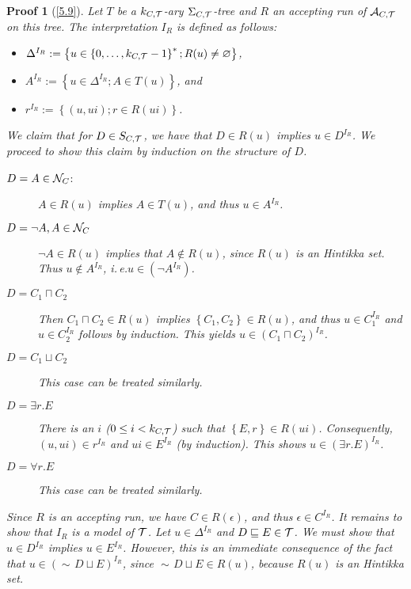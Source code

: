 \documentclass[openany]{scrbook}
\theoremstyle{break}
\theoremstyle{nonumberbreak}
\theoremstyle{nonumberplain}
\theoremstyle{nonumberbreak}
\newtheorem{Proof}{Proof}
\newcommand{\set}[1]{\left\{#1\right\}}
\newcommand{\ie}{i{.}\,e{.}\xspace}
\newcommand{\nnf}{\mathop{\sim\!}}
\begin{document}
\begin{Proof}[\cref{5.9}]
  Let $T$ be a $k_{C, {\cal T}}$-ary $\Sigma_{C, {\cal T}}$-tree and
  $R$ an accepting run of ${\cal A}_{C, {\cal T}}$ on this tree. The
  interpretation $I_R$ is defined as follows:
  \begin{itemize}
  \item $\Delta^{I_R} := \set{u \in \set{0, \dotsc, k_{C, {\cal T}} -
        1}^*; R(u) \ne \varnothing}$,
  \item $A^{I_R} := \set{u \in \Delta^{I_R}; A \in T(u)}$, and
  \item $r^{I_R} := \set{(u, ui); r \in R(ui)}$.
  \end{itemize}

  We claim that for $D \in S_{C, {\cal T}}$, we have that $D \in R(u)$
  implies $u \in D^{I_R}$. We proceed to show this claim by induction
  on the structure of $D$.
  \begin{description}
  \item[$D = A \in {\cal N}_C$:] $A \in R(u)$ implies $A \in T(u)$,
    and thus $u \in A^{I_R}$.
  \item[$D = \neg A, A \in {\cal N}_C$] $\neg A \in R(u)$
    implies that $A \not\in R(u)$, since $R(u)$ is an Hintikka set. Thus
    $u \not\in A^{I_R}$, \ie $u \in (\neg A^{I_R})$.
  \item[$D = C_1 \sqcap C_2$] Then $C_1 \sqcap C_2 \in R(u)$ implies
    $\set{C_1, C_2} \in R(u)$, and thus $u \in C_1^{I_R}$ and $u \in
    C_2^{I_R}$ follows by induction. This yields $u \in (C_1 \sqcap
    C_2)^{I_R}$.
  \item[$D = C_1 \sqcup C_2$] This case can be treated similarly.
  \item[$D = \exists r.E$] There is an $i$ ($0 \leq i < k_{C, {\cal
        T}}$) such that $\set{E, r} \in R(ui)$. Consequently, $(u, ui)
    \in r^{I_R}$ and $ui \in E^{I_R}$ (by induction). This shows $u
    \in (\exists r.E)^{I_R}$.
  \item[$D = \forall r.E$] This case can be treated similarly.
  \end{description}

  Since $R$ is an accepting run, we have $C \in R(\epsilon)$, and thus
  $\epsilon \in C^{I_R}$. It remains to show that $I_R$ is a model of
  ${\cal T}$. Let $u \in \Delta^{I_R}$ and $D \sqsubseteq E \in {\cal
    T}$. We must show that $u \in D^{I_R}$ implies $u \in
  E^{I_R}$. However, this is an immediate consequence of the fact that
  $u \in (\nnf D \sqcup E)^{I_R}$, since $\nnf D \sqcup E \in R(u)$,
  because $R(u)$ is an Hintikka set.


\end{Proof}
\end{document}
